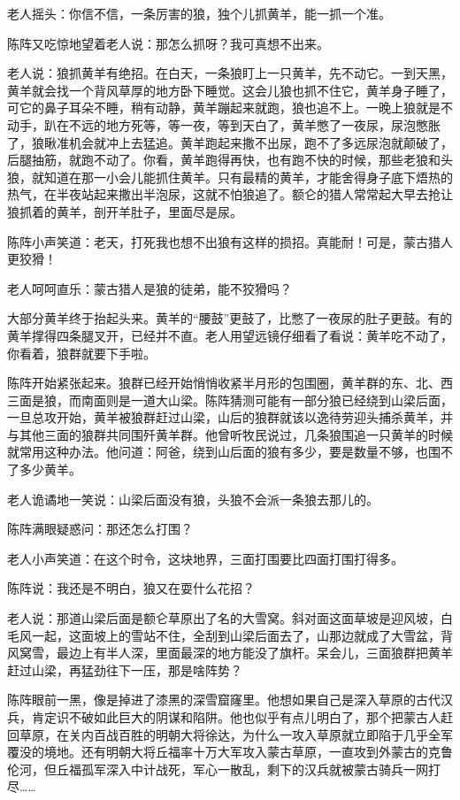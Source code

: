 \par 老人摇头：你信不信，一条厉害的狼，独个儿抓黄羊，能一抓一个准。
\par 陈阵又吃惊地望着老人说：那怎么抓呀？我可真想不出来。
\par 老人说：狼抓黄羊有绝招。在白天，一条狼盯上一只黄羊，先不动它。一到天黑，黄羊就会找一个背风草厚的地方卧下睡觉。这会儿狼也抓不住它，黄羊身子睡了，可它的鼻子耳朵不睡，稍有动静，黄羊蹦起来就跑，狼也追不上。一晚上狼就是不动手，趴在不远的地方死等，等一夜，等到天白了，黄羊憋了一夜尿，尿泡憋胀了，狼瞅准机会就冲上去猛追。黄羊跑起来撒不出尿，跑不了多远尿泡就颠破了，后腿抽筋，就跑不动了。你看，黄羊跑得再快，也有跑不快的时候，那些老狼和头狼，就知道在那一小会儿能抓住黄羊。只有最精的黄羊，才能舍得身子底下焐热的热气，在半夜站起来撒出半泡尿，这就不怕狼追了。额仑的猎人常常起大早去抢让狼抓着的黄羊，剖开羊肚子，里面尽是尿。
\par 陈阵小声笑道：老天，打死我也想不出狼有这样的损招。真能耐！可是，蒙古猎人更狡猾！
\par 老人呵呵直乐：蒙古猎人是狼的徒弟，能不狡猾吗？
\par 大部分黄羊终于抬起头来。黄羊的“腰鼓”更鼓了，比憋了一夜尿的肚子更鼓。有的黄羊撑得四条腿叉开，已经并不直。老人用望远镜仔细看了看说：黄羊吃不动了，你看着，狼群就要下手啦。
\par 陈阵开始紧张起来。狼群已经开始悄悄收紧半月形的包围圈，黄羊群的东、北、西三面是狼，而南面则是一道大山梁。陈阵猜测可能有一部分狼已经绕到山梁后面，一旦总攻开始，黄羊被狼群赶过山梁，山后的狼群就该以逸待劳迎头捕杀黄羊，并与其他三面的狼群共同围歼黄羊群。他曾听牧民说过，几条狼围追一只黄羊的时候就常用这种办法。他问道：阿爸，绕到山后面的狼有多少，要是数量不够，也围不了多少黄羊。
\par 老人诡谲地一笑说：山梁后面没有狼，头狼不会派一条狼去那儿的。
\par 陈阵满眼疑惑问：那还怎么打围？
\par 老人小声笑道：在这个时令，这块地界，三面打围要比四面打围打得多。
\par 陈阵说：我还是不明白，狼又在耍什么花招？
\par 老人说：那道山梁后面是额仑草原出了名的大雪窝。斜对面这面草坡是迎风坡，白毛风一起，这面坡上的雪站不住，全刮到山梁后面去了，山那边就成了大雪盆，背风窝雪，最边上有半人深，里面最深的地方能没了旗杆。呆会儿，三面狼群把黄羊赶过山梁，再猛劲往下一压，那是啥阵势？
\par 陈阵眼前一黑，像是掉进了漆黑的深雪窟窿里。他想如果自己是深入草原的古代汉兵，肯定识不破如此巨大的阴谋和陷阱。他也似乎有点儿明白了，那个把蒙古人赶回草原，在关内百战百胜的明朝大将徐达，为什么一攻入草原就立即陷于几乎全军覆没的境地。还有明朝大将丘福率十万大军攻入蒙古草原，一直攻到外蒙古的克鲁伦河，但丘福孤军深入中计战死，军心一散乱，剩下的汉兵就被蒙古骑兵一网打尽……
